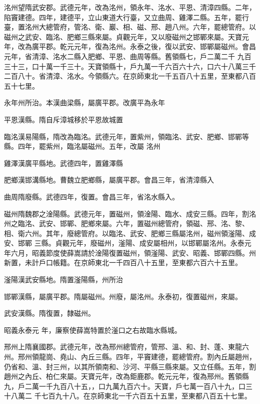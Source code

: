 \begin{pinyinscope}
 洺州望隋武安郡。武德元年，改為洺州，領永年、洺水、平恩、清漳四縣。二年，陷竇建德。四年，建德平，立山東道大行臺，又立曲周、雞澤二縣。五年，罷行臺，置洺州大總管府，管洺、衛、巖、相、磁、邢、趙八州。六年，罷總管府。以磁州之武安、臨洺、肥鄉三縣來屬。貞觀元年，又以廢磁州之邯鄲來屬。天寶元年，改為廣平郡。乾元元年，復為洺州。永泰之後，復以武安、邯鄲屬磁州。會昌元年，省清漳、洺水二縣入肥鄉、平恩、曲周等縣。舊領縣七，戶二萬二千
 九百三十三，口十萬一千三十。天寶領縣十，戶九萬一千六百六十六，口六十八萬三千二百八十。省清漳、洺水。今領縣六。在京師東北一千五百八十五里，至東都八百五十七里。



 永年州所治。本漢曲梁縣，屬廣平郡。改廣平為永年



 平恩漢縣。隋自斥漳城移於平恩故城置



 臨洺漢易陽縣，隋改為臨洺。武德元年，置紫州，領臨洺、武安、肥鄉、邯鄲等縣。四年，罷紫州，臨洺屬磁州。五年，改屬
 洺州



 雞澤漢廣平縣地。武德四年，置雞澤縣



 肥鄉漢邯溝縣地。曹魏立肥鄉縣，屬廣平郡。會昌三年，省清漳縣入



 曲周隋廢縣。武德四年，復置。會昌三年，省洺水縣入。



 磁州隋魏郡之淦陽縣。武德元年，置磁州，領淦陽、臨水、成安三縣。四年，割洺州之臨洺、武安、邯鄲、肥鄉來屬。六年，置磁州總管府，領磁、邢、洺、黎、相、衛六州。其年，廢總管府。以臨洺、武安、肥鄉三縣屬洺州，磁州領滏陽、成安、邯鄲
 三縣。貞觀元年，廢磁州，滏陽、成安屬相州，以邯鄲屬洺州。永泰元年六月，昭義節度使薛嵩請於淦陽復置磁州，領滏陽、武安、昭義、邯鄲四縣。州新置，未計戶口帳籍。在京師東北一千四百八十五里，至東都六百六十五里。



 滏陽漢武安縣地。隋置滏陽縣，州所治



 邯鄲漢縣，屬廣平郡。隋屬磁州。州廢，屬洺州。永泰初，復置磁州，來屬。



 武安漢縣。隋復置，隸磁州。



 昭義永泰元
 年，廉察使薛嵩特置於滏口之右故臨水縣城。



 邢州上隋襄國郡。武德元年，改為邢州總管府，管邢、溫、和、封、蓬、東龍六州。邢州領龍崗、堯山、內丘三縣。四年，平竇建德，罷總管府。割內丘屬趙州，仍省和、溫、封三州，以其所領南和、沙河、平縣三縣來屬。又立任縣。五年，割趙州之內丘、柏仁來屬。天寶元年，改為鉅鹿郡。乾元元年，復為邢州。舊領縣九，戶二萬一千九百八十五，，口九萬九百六十。天寶，戶七萬一百八十九，口三十八萬二
 千七百九十八。在京師東北一千六百五十五里，至東都八百五十七里。




\end{pinyinscope}
